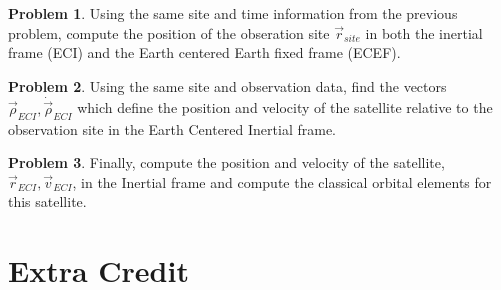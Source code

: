 \documentclass[10pt]{article}
\theoremstyle{definition}
\newtheorem{prob}{Problem}[section]
\begin{document}
\begin{prob}
    Using the same site and time information from the previous problem, compute the position of the obseration site \( \vec r_{site} \) in both the inertial frame (ECI) and the Earth centered Earth fixed frame (ECEF).
\end{prob}

\begin{prob}
    Using the same site and observation data, find the vectors \( \vec \rho_{ECI}, \dot \vec \rho_{ECI} \) which define the position and velocity of the satellite relative to the observation site in the Earth Centered Inertial frame.
\end{prob}

\begin{prob}
    Finally, compute the position and velocity of the satellite, \( \vec r_{ECI}, \vec v_{ECI} \), in the Inertial frame and compute the classical orbital elements for this satellite.
\end{prob}

\section*{Extra Credit}
\end{document}

